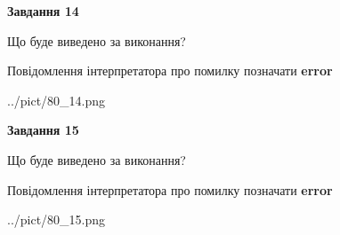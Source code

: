 \documentclass[11pt, ukrainian]{article}
\begin{document}
{\begin {large}
{\begin {center}\textbf{Завдання 14}\end {center}}\par
Що буде виведено за виконання? \par
Повідомлення інтерпретатора про помилку позначати \textbf{error}

\begin{center}
	{../pict/80_14.png}
\end{center}
\newpage

{\begin {center}\textbf{Завдання 15}\end {center}}\par
Що буде виведено за виконання? \par
Повідомлення інтерпретатора про помилку позначати \textbf{error}

\begin{center}
	{../pict/80_15.png}
\end{center}
\newpage

\end {large}}
\end{document}
